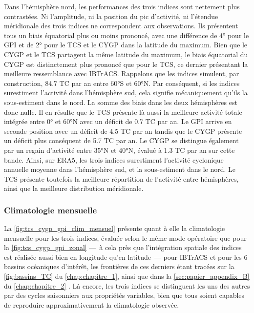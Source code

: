 \documentclass[../main.tex]{subfiles}
\begin{document}
Dans l'hémisphère nord, les performances des trois indices sont nettement plus contrastées. Ni l'amplitude, ni la position du pic d'activité, ni l'étendue
méridionale des trois indices ne correspondent aux observations. Ils présentent tous un biais équatorial plus ou moins prononcé, avec une différence de \ang{4}
pour le GPI et de \ang{2} pour le TCS et le CYGP dans la latitude du maximum. Bien que le CYGP et le TCS partagent la même latitude du maximum, le biais
équatorial du CYGP est distinctement plus prononcé que pour le TCS, ce dernier présentant la meilleure ressemblance avec IBTrACS. Rappelons que les indices
simulent, par construction, \num{84.7} TC par an entre \ang{60}S et \ang{60}N. Par conséquent, si les indices surestiment l'activité dans l'hémisphère sud, cela
signifie mécaniquement qu'ils la sous-estiment dans le nord. La somme des biais dans les deux hémisphères est donc nulle. Il en résulte que le TCS présente là
aussi la meilleure activité totale intégrée entre \ang{0} et \ang{60}N avec un déficit de \num{0.7} TC par an. Le GPI arrive en seconde position avec un déficit
de \num{4.5} TC par an tandis que le CYGP présente un déficit plus conséquent de \num{5.7} TC par an. Le CYGP se distingue également par un regain d'activité
entre \ang{35}N et \ang{40}N, évalué à \num{1.3} TC par an sur cette bande. Ainsi, sur ERA5, les trois indices surestiment l'activité cyclonique annuelle
moyenne dans l'hémisphère sud, et la sous-estiment dans le nord. Le TCS présente toutefois la meilleure répartition de l'activité entre hémisphères, ainsi que la
meilleure distribution méridionale.

\subsubsection*{Climatologie mensuelle}

La \cref{fig:tcs_cygp_gpi_clim_mensuel} présente quant à elle la climatologie mensuelle pour les trois indices, évaluée selon le même mode opératoire que pour
la \cref{fig:tcs_cygp_gpi_zonal} ---~à cela près que l'intégration spatiale des indices est réalisée aussi bien en longitude qu'en latitude~--- pour IBTrACS et
pour les 6 bassins océaniques d'intérêt, les frontières de ces derniers étant tracées sur la \cref{fig:bassins_TC} du \cref{chap:chapitre_1}, ainsi que dans la
\cref{sec:papier_appendix_B} du \cref{chap:chapitre_2} \parencite[][documents supplémentaires]{dulac_assessing_2023}. Là encore, les trois indices se
distinguent les uns des autres par des cycles saisonniers aux propriétés variables, bien que tous soient capables de reproduire approximativement la
climatologie observée. 
\end{document}

